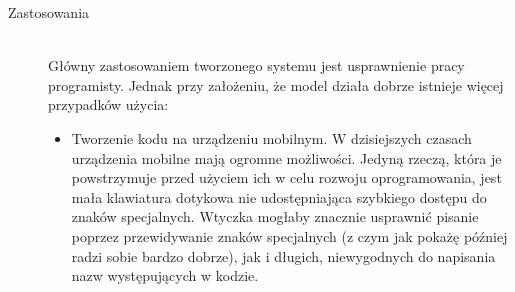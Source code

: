 \begin{description}



\item [Zastosowania]
\hfill\\
\label{zastosowania}
Główny zastosowaniem tworzonego systemu jest usprawnienie pracy programisty. Jednak przy założeniu, że model działa dobrze 
istnieje więcej przypadków użycia: 
\begin{itemize}
	\item Tworzenie kodu na urządzeniu mobilnym. W dzisiejszych czasach urządzenia mobilne mają ogromne możliwości. 
	Jedyną rzeczą, która je powstrzymuje przed użyciem ich w celu rozwoju oprogramowania, jest mała klawiatura dotykowa nie
	udostępniająca szybkiego dostępu do znaków specjalnych. Wtyczka mogłaby znacznie usprawnić pisanie poprzez przewidywanie znaków 
	specjalnych (z czym jak pokażę później radzi sobie bardzo dobrze), jak i długich, niewygodnych do napisania nazw występujących w kodzie.


\end{itemize}
\end{description}
